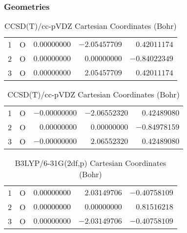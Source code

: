 \documentclass[10pt,oneside]{article}
\begin{document}
\begin{table}[h!]
\subsubsection*{Geometries}
\begin{multicols}{2}
\centering
\caption{CCSD(T)/cc-pVTZ Cartesian Coordinates (Bohr)}
\begin{tabular}{llrrr}
\toprule
1  & O  & $ 0.00000000$ & $-2.05457709$ & $ 0.42011174$ \\
2  & O  & $ 0.00000000$ & $ 0.00000000$ & $-0.84022349$ \\
3  & O  & $ 0.00000000$ & $ 2.05457709$ & $ 0.42011174$ \\
\bottomrule
\end{tabular}
\caption{CCSD(T)/cc-pVDZ Cartesian Coordinates (Bohr)}
\begin{tabular}{llrrr}
\toprule
1  & O  & $-0.00000000$ & $-2.06552320$ & $ 0.42489080$ \\
2  & O  & $ 0.00000000$ & $ 0.00000000$ & $-0.84978159$ \\
3  & O  & $-0.00000000$ & $ 2.06552320$ & $ 0.42489080$ \\
\bottomrule
\end{tabular}
\end{multicols}
\end{table}

\begin{table}[h]
\centering
\caption{B3LYP/6-31G(2df,p) Cartesian Coordinates (Bohr)}
\begin{tabular}{llrrr}
\toprule
1  & O  & $ 0.00000000$ & $ 2.03149706$ & $-0.40758109$ \\
2  & O  & $ 0.00000000$ & $ 0.00000000$ & $ 0.81516218$ \\
3  & O  & $ 0.00000000$ & $-2.03149706$ & $-0.40758109$ \\
\bottomrule
\end{tabular}
\end{table}
\end{document}
